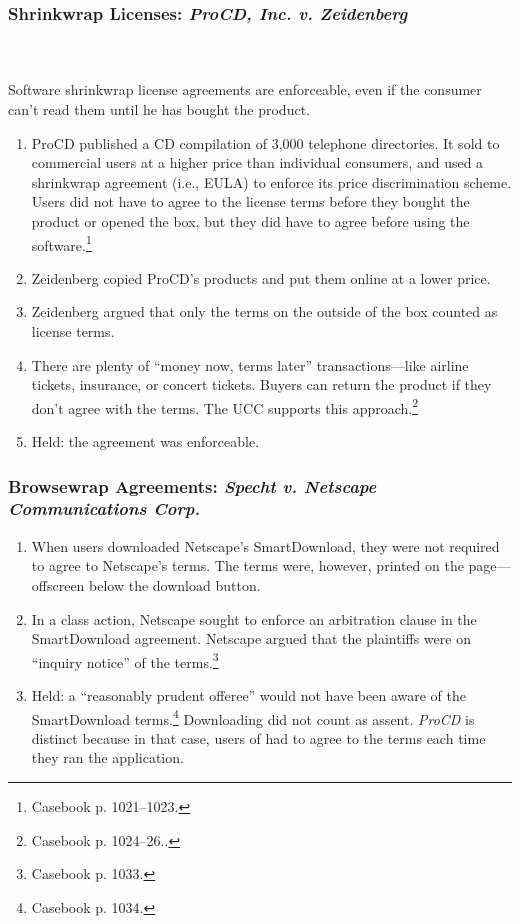 \subsubsection{Shrinkwrap Licenses: \emph{ProCD, Inc. v. Zeidenberg}}
~\\\\
Software shrinkwrap license agreements are enforceable, even if the consumer 
can't read them until he has bought the product.

\begin{enumerate}
    \item ProCD published a CD compilation of 3,000 telephone directories. It 
    sold to commercial users at a higher price than individual consumers, and 
    used a shrinkwrap agreement (i.e., EULA) to enforce its price 
    discrimination scheme. Users did not have to agree to the license terms 
    before they bought the product or opened the box, but they did have to 
    agree before using the software.\footnote{Casebook p. 1021--1023.}
    \item Zeidenberg copied ProCD's products and put them online at a lower 
    price.
    \item Zeidenberg argued that only the terms on the outside of the box 
    counted as license terms.
    \item There are plenty of ``money now, terms later'' transactions---like 
    airline tickets, insurance, or concert tickets. Buyers can return the 
    product if they don't agree with the terms. The UCC supports this 
    approach.\footnote{Casebook p. 1024--26..}
    \item Held: the agreement was enforceable.
\end{enumerate}

\subsubsection{Browsewrap Agreements: \emph{Specht v. Netscape Communications 
Corp.}}

\begin{enumerate}
    \item When users downloaded Netscape's SmartDownload, they were not 
    required to agree to Netscape's terms. The terms were, however, printed on 
    the page---offscreen below the download button.
    \item In a class action, Netscape sought to enforce an arbitration clause 
    in the SmartDownload agreement. Netscape argued that the plaintiffs were 
    on ``inquiry notice'' of the terms.\footnote{Casebook p. 1033.}
    \item Held: a ``reasonably prudent offeree'' would not have been aware of 
    the SmartDownload terms.\footnote{Casebook p. 1034.} Downloading did not 
    count as assent. \emph{ProCD} is distinct because in that case, users of 
    had to agree to the terms each time they ran the application.
\end{enumerate}

